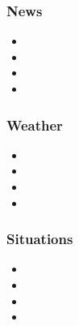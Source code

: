 \documentclass[serif, mathserif, final]{beamer}
\begin{document}
    \begin{frame}
      \frametitle{News} 
        \begin{itemize}
          \tiny \item \tiny
        \item \tiny
        \item \tiny
        \item \tiny
        \end{itemize}
      \end{frame}

    \begin{frame}
      \frametitle{Weather} 
        \begin{itemize}
          \tiny \item \tiny
        \item \tiny
        \item \tiny
        \item \tiny
        \end{itemize}
      \end{frame}

   \begin{frame}
      \frametitle{Situations} 
        \begin{itemize}
          \tiny \item \tiny
        \item \tiny
        \item \tiny
        \item \tiny
        \end{itemize}
      \end{frame}
\end{document}
